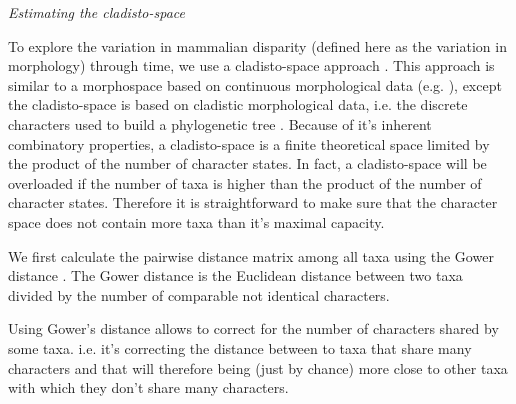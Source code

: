 \documentclass[12pt,letterpaper]{article}
\renewcommand{\subsection}[1]{%
\bigskip
\begin{center}
\begin{large}
\normalfont\itshape #1
\end{large}
\end{center}}
\begin{document}
\subsection{Estimating the cladisto-space} %
To explore the variation in mammalian disparity (defined here as the variation in morphology) through time, we use a cladisto-space approach \cite{Foote01071994,Foote29111996,Wesley-Hunt2005,Brusatte12092008,friedmanexplosive2010,toljagictriassic-jurassic2013}. This approach is similar to a morphospace based on continuous morphological data (e.g. \cite{finlay2015morphological}), except the cladisto-space is based on cladistic morphological data, i.e. the discrete characters used to build a phylogenetic tree \cite{Foote01071994,Foote29111996,Wesley-Hunt2005,Brusatte12092008,friedmanexplosive2010,toljagictriassic-jurassic2013}.
Because of it's inherent combinatory properties, a cladisto-space is a finite theoretical space limited by the product of the number of character states. In fact, a cladisto-space will be overloaded if the number of taxa is higher than the product of the number of character states. Therefore it is straightforward to make sure that the character space does not contain more taxa than it's maximal capacity.

We first calculate the pairwise distance matrix among all taxa using the Gower distance \cite{Gower71}. The Gower distance is the Euclidean distance between two taxa divided by the number of comparable not identical characters. 

Using Gower's distance allows to correct for the number of characters shared by some taxa. i.e. it's correcting the distance between to taxa that share many characters and that will therefore being (just by chance) more close to other taxa with which they don't share many characters.
\end{document}
